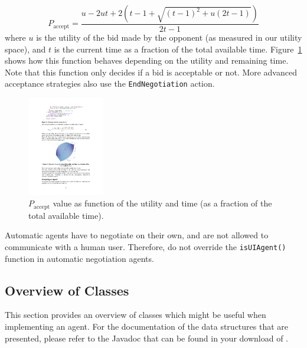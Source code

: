 \documentclass[]{article}
\begin{document}
\begin{equation}
	P_\text{accept} = \dfrac{u - 2ut + 2\left(t - 1 + \sqrt{(t - 1)^2 + u(2t - 1)}\right)}{2t - 1}
\end{equation}
where $u$ is the utility of the bid made by the opponent (as measured in our utility space), and $t$ is the current time as a fraction of the total available time. Figure~\ref{Fig:Paccept} shows how this function behaves depending on the utility and remaining time. Note that this function only decides if a bid is acceptable or not. More advanced acceptance strategies also use the \texttt{EndNegotiation} action.
\begin{figure}[htb]
	\centering
	\includegraphics[width=0.3\textwidth]{media/image21.pdf}
	\caption{$P_\text{accept}$ value as function of the utility and time (as a fraction of the total available time).}\label{Fig:Paccept}
\end{figure}
 
Automatic agents have to negotiate on their own, and are not allowed to communicate with a human user. Therefore, do not override the \texttt{isUIAgent()} function in automatic negotiation agents.

\subsection{Overview of Classes}
This section provides an overview of classes which might be useful when implementing an agent. For the documentation of the data structures that are presented, please refer to the Javadoc that can be found in your download of \Genius. 
\end{document}
